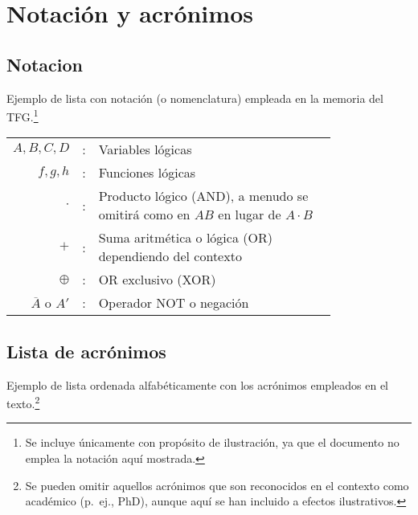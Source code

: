 %
%
\cleardoublepage
{} %


\chapter*{Notación y acrónimos} %

\section*{Notacion}
Ejemplo de lista con notación (o nomenclatura) empleada en la memoria del TFG.\footnote{Se incluye únicamente con propósito de ilustración, ya que el documento no emplea la notación aquí mostrada.}

\begin{tabular}{r r p{0.8\linewidth}}
$A, B, C, D$	& : & Variables lógicas \\
$f, g, h$		& :	& Funciones lógicas \\
$\cdot$			& : & Producto lógico (AND), a menudo se omitirá como en $A 
B$ en lugar de $A \cdot B$\\
$+$				& : & Suma aritmética o lógica (OR) dependiendo del 
contexto\\
$\oplus$		& : & OR exclusivo (XOR)\\
$\overline{A}$ o ${A}'$	& : & Operador NOT o negación
\end{tabular}

\section*{Lista de acrónimos}
Ejemplo de lista ordenada alfabéticamente con los acrónimos empleados en el texto.\footnote{Se pueden omitir aquellos acrónimos que son reconocidos en el contexto como académico (p.~ej., PhD), aunque aquí se han incluido a efectos ilustrativos.}

